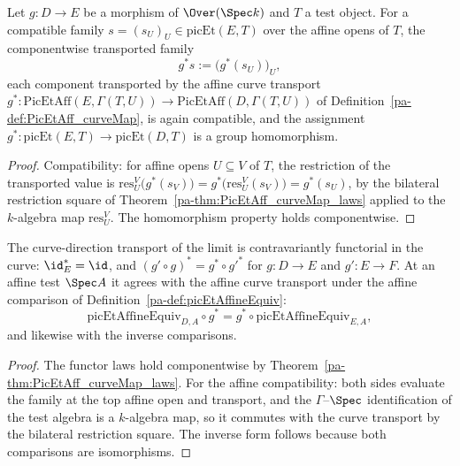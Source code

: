 \begin{definition}
  \label{pa-def:picEtPullback}
  \leanok

  Let \(g \colon D \to E\) be a morphism of \(\Over(\Spec k)\) and \(T\) a test object.
  For a compatible family \(s = (s_U)_U \in \mathrm{picEt}(E, T)\) over the affine opens
  of \(T\), the componentwise transported family
  \[
    g^{*} s := \bigl( g^{*}(s_U) \bigr)_{U},
  \]
  each component transported by the affine curve transport
  \(g^{*} \colon \mathrm{PicEtAff}(E, \Gamma(T, U)) \to
  \mathrm{PicEtAff}(D, \Gamma(T, U))\) of Definition~\ref{pa-def:PicEtAff_curveMap}, is
  again compatible, and the assignment
  \(g^{*} \colon \mathrm{picEt}(E, T) \to \mathrm{picEt}(D, T)\) is a group
  homomorphism.
\end{definition}
\begin{proof}
  \leanok
  Compatibility: for affine opens \(U \subseteq V\) of \(T\), the restriction of the
  transported value is
  \(\mathrm{res}^V_U\bigl(g^{*}(s_V)\bigr) = g^{*}\bigl(\mathrm{res}^V_U(s_V)\bigr)
  = g^{*}(s_U)\), by the bilateral restriction square of
  Theorem~\ref{pa-thm:PicEtAff_curveMap_laws} applied to the \(k\)-algebra map
  \(\mathrm{res}^V_U\). The homomorphism property holds componentwise.
\end{proof}

\begin{theorem}
  \label{pa-thm:picEtPullback_laws}
  \leanok

  The curve-direction transport of the limit is contravariantly functorial in the curve:
  \(\id_E^{*} = \id\), and \((g' \circ g)^{*} = g^{*} \circ g'^{*}\) for
  \(g \colon D \to E\) and \(g' \colon E \to F\). At an affine test \(\Spec A\) it
  agrees with the affine curve transport under the affine comparison of
  Definition~\ref{pa-def:picEtAffineEquiv}:
  \[
    \mathrm{picEtAffineEquiv}_{D,A} \circ g^{*}
      = g^{*} \circ \mathrm{picEtAffineEquiv}_{E,A},
  \]
  and likewise with the inverse comparisons.
\end{theorem}
\begin{proof}
  \leanok
  The functor laws hold componentwise by Theorem~\ref{pa-thm:PicEtAff_curveMap_laws}. For
  the affine compatibility: both sides evaluate the family at the top affine open and
  transport, and the \(\Gamma\)--\(\Spec\) identification of the test algebra is a
  \(k\)-algebra map, so it commutes with the curve transport by the bilateral
  restriction square. The inverse form follows because both comparisons are
  isomorphisms.
\end{proof}

